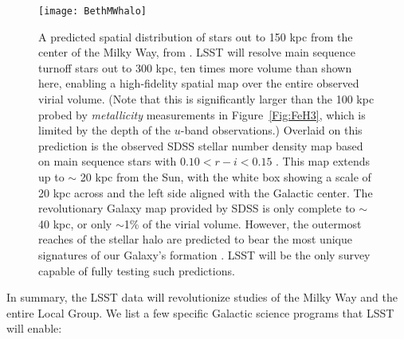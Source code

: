 \begin{figure}
\texttt{[image: BethMWhalo]}
\caption{A predicted spatial distribution of stars out to 150 kpc from the center of the Milky Way,
from \citet{2005ApJ...635..931B}.  LSST will resolve main sequence turnoff stars out to 300 kpc, ten times
more volume than shown here, enabling a high-fidelity spatial map over
the entire observed virial volume. (Note that this is significantly larger than the
100 kpc probed by \emph{metallicity} measurements in
Figure~\ref{Fig:FeH3}, which is limited by the depth of the $u$-band observations.)
Overlaid on this prediction is the observed SDSS stellar number density map based on main sequence stars
with $0.10 < r-i < 0.15$ \citep{2008ApJ...673..864J}.  This map extends up to $\sim$ 20 kpc from the Sun, with
the white box showing a scale of 20 kpc across and the left side aligned with the Galactic center.
The revolutionary Galaxy map provided by SDSS is only complete to $\sim$40 kpc, or only $\sim$1\% of
the virial volume.  However, the outermost reaches of the stellar halo are predicted to bear the most unique
signatures of our Galaxy's formation \citep{2008ApJ...689..936J,2010MNRAS.406..744C}.   LSST will be the only survey
capable of fully testing such predictions.}
\label{Fig:halo}
\end{figure}



In summary, the LSST data will revolutionize studies of the Milky Way and the entire Local Group. We list a few specific
Galactic science programs that LSST will enable:


